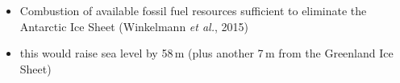 \documentclass[hide notes,intlimits]{beamer}
\begin{document}
\begin{frame}[plain]
    \begin{itemize}
      \item Combustion of available fossil fuel resources sufficient to eliminate the Antarctic Ice Sheet (Winkelmann \emph{et al.}, 2015)
      \item this would raise sea level by 58\,m (plus another 7\,m from the Greenland Ice Sheet)
    \end{itemize}
\end{frame}


  {
} 

\begin{frame}[plain]
\end{frame}

  {
} 
\end{document}
